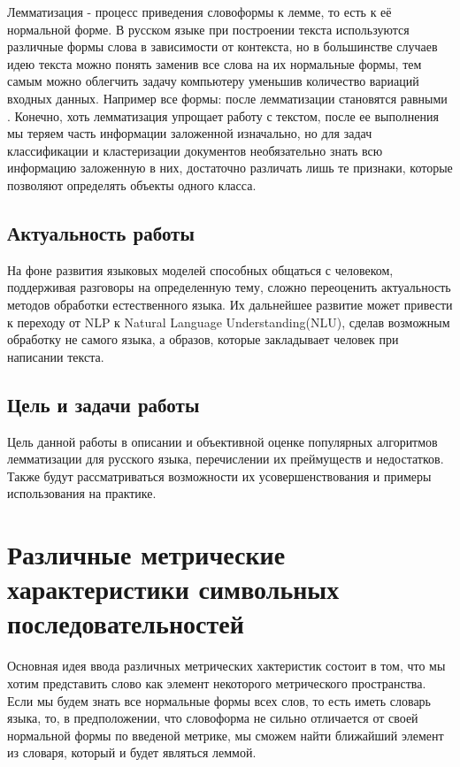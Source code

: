 \documentclass[12pt, a4paper]{article}
\begin{document}
Лемматизация - процесс приведения словоформы к лемме, то есть к её нормальной форме. В русском языке при построении текста используются различные формы слова в зависимости от контекста, но в большинстве случаев идею текста можно понять заменив все слова на их нормальные формы, тем самым можно облегчить задачу компьютеру уменьшив количество вариаций входных данных. Например все формы:  после лемматизации становятся равными . Конечно, хоть лемматизация упрощает работу с текстом, после ее выполнения мы теряем часть информации заложенной изначально, но для задач классификации и кластеризации документов необязательно знать всю информацию заложенную в них, достаточно различать лишь те признаки, которые позволяют определять объекты одного класса.

\subsection{Актуальность работы}
\quad На фоне развития языковых моделей способных общаться с человеком, поддерживая разговоры на определенную тему, сложно переоценить актуальность методов обработки естественного языка. Их дальнейшее развитие может привести к переходу от NLP к Natural Language Understanding(NLU), сделав возможным обработку не самого языка, а образов, которые закладывает человек при написании текста.

\subsection{Цель и задачи работы}
\quad Цель данной работы в описании и объективной оценке популярных алгоритмов лемматизации для русского языка, перечислении их преймуществ и недостатков. Также будут рассматриваться возможности их усовершенствования и примеры использования на практике.

\section{Различные метрические характеристики символьных последовательностей}
\quad Основная идея ввода различных метрических хактеристик состоит в том, что мы хотим представить слово как элемент некоторого метрического пространства. Если мы будем знать все нормальные формы всех слов, то есть иметь словарь языка, то, в предположении, что словоформа не сильно отличается от своей нормальной формы по введеной метрике, мы сможем найти ближайший элемент из словаря, который и будет являться леммой.
\end{document}
